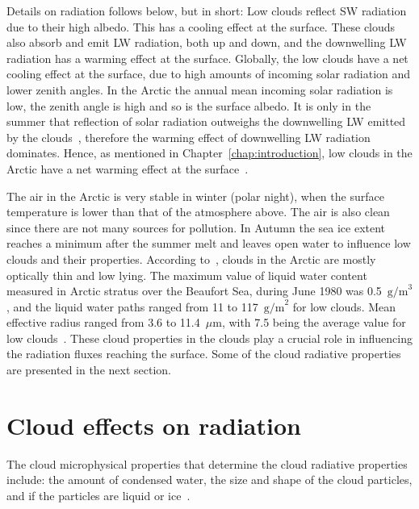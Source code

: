 Details on radiation follows below, but in short: Low clouds reflect SW radiation due to their high albedo. This has a cooling effect at the surface. These clouds also absorb and emit LW radiation, both up and down, and the downwelling LW radiation has a warming effect at the surface. Globally, the low clouds have a net cooling effect at the surface, due to high amounts of incoming solar radiation and lower zenith angles. In the Arctic the annual mean incoming solar radiation is low, the zenith angle is high and so is the surface albedo. It is only in the summer that reflection of solar radiation outweighs the downwelling LW emitted by the clouds~\citep{Curry1996}, therefore the warming effect of downwelling LW radiation dominates. Hence, as mentioned in Chapter~\ref{chap:introduction}, low clouds in the Arctic have a net warming effect at the surface~\citep{Shupe2004}.

The air in the Arctic is very stable in winter (polar night), when the surface temperature is lower than that of the atmosphere above. The air is also clean since there are not many sources for pollution. In Autumn the sea ice extent reaches a minimum after the summer melt and leaves open water to influence low clouds and their properties. According to~\citet{Curry1996}, clouds in the Arctic are mostly optically thin and low lying. The maximum value of liquid water content measured in Arctic stratus over the Beaufort Sea, during June 1980 was 0.5~$\text{g/m}^3$, and the liquid water paths ranged from 11 to 117~$\text{g/m}^2$ for low clouds. Mean effective radius ranged from 3.6 to 11.4~$\mu\text{m}$, with 7.5 being the average value for low clouds~\citep{Curry1996}. These cloud properties in the clouds play a crucial role in influencing the radiation fluxes reaching the surface. Some of the cloud radiative properties are presented in the next section.

\section{Cloud effects on radiation}
The cloud microphysical properties that determine the cloud radiative properties include: the amount of condensed water, the size and shape of the cloud particles, and if the particles are liquid or ice~\citep{Curry1996}.

